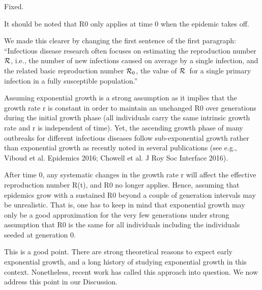 \documentclass[12pt]{article}
\newcommand{\RR}{\ensuremath{{\cal R}}}
\newcommand{\Rx}[1]{\ensuremath{{\cal R}_{#1}}}
\newcommand{\Ro}{\Rx{0}}
\newcommand{\revtext}{\textsf}
\begin{document}
Fixed.

\revtext{It should be noted that R0 only applies at time 0 when the epidemic takes off.}

We made this clearer by changing the first sentence of the first paragraph: ``Infectious disease research often focuses on estimating the reproduction number \RR, i.e., the number of new infections caused on average by a single infection, and the related basic reproduction number \Ro, the value of \RR\ for a single primary infection in a fully susceptible population.''

\revtext{Assuming exponential growth is a strong assumption as it
implies that the growth rate r is constant in order to maintain an
unchanged R0 over generations during the initial growth phase (all
individuals carry the same intrinsic growth rate and r is independent
of time). Yet, the ascending growth phase of many outbreaks for
different infectious diseases follow sub-exponential growth rather
than exponential growth as recently noted in several publications
(see e.g.,  Viboud et al. Epidemics 2016; Chowell et al. J Roy Soc
Interface 2016).}

\revtext{After time 0, any systematic changes in the growth rate r will
affect the effective reproduction number R(t), and R0 no longer
applies.  Hence, assuming that epidemics grow with a sustained R0
beyond a couple of generation intervals may be unrealistic. That is,
one has to keep in mind that exponential growth may only be a good
approximation for the very few generations under strong assumption
that R0 is the same for all individuals including the individuals
seeded at generation 0.}

This is a good point. There are strong theoretical reasons to expect early exponential growth, and a long history of studying exponential growth in this context. Nonetheless, recent work has called this approach into question. We now address this point in our Discussion.
\end{document}
